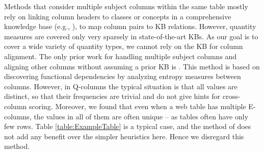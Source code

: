 Methods that consider multiple subject columns within the same table mostly rely on linking column headers to classes or concepts in a comprehensive knowledge base (e.g., \cite{DBLP:journals/pvldb/LimayeSC10, DBLP:conf/semweb/BhagavatulaND15, DBLP:conf/cikm/IbrahimRW16, DBLP:conf/semweb/EfthymiouHRC17, DBLP:conf/edbt/RitzeB17}), to map column pairs to KB relations. However, quantity measures are covered only very sparsely in state-of-the-art KBs.
As our goal is to cover a wide variety of 
quantity types,
we cannot 
rely on the KB for column alignment.
The only prior work for handling multiple subject columns and aligning other columns without assuming a prior KB
is \cite{DBLP:conf/er/BraunschweigTL15}.
%
This method is based on discovering functional dependencies by 
analyzing entropy measures between columns. However, in Q-columns the
typical situation is that all values are distinct, so that their frequencies
are trivial and do not give hints for cross-column scoring.
Moreover, we found that even when a web table has multiple E-columns,
the values in all of them are often unique -- as tables often
have only few rows. Table \ref{table:ExampleTable} is a typical case,
and the method of \cite{DBLP:conf/er/BraunschweigTL15} does not 
add any benefit over the simpler heuristics here.
Hence we disregard this method.


